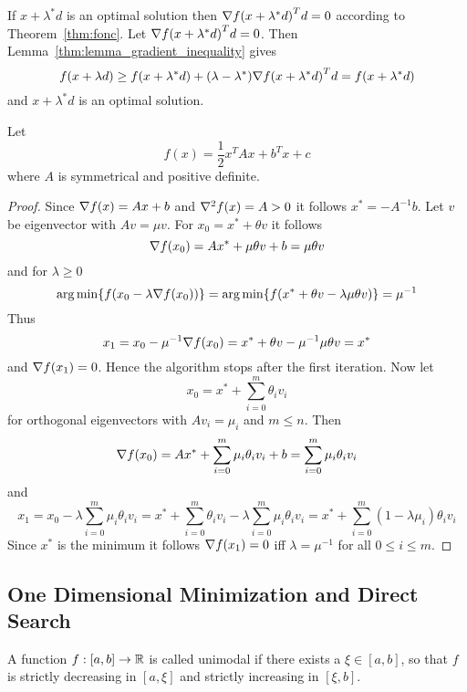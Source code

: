 \proof{}
If  \( x + \lambda^* d \) is an optimal solution then \( \nabla {f(x + \lambda^* d)}^T d = 0 \)
according to Theorem~\ref{thm:fonc}.
Let \( \nabla {f(x + \lambda^* d)}^T d = 0 \). Then Lemma~\ref{thm:lemma_gradient_inequality} gives
\[
    f(x + \lambda d) \ge f(x + \lambda^* d) + (\lambda - \lambda^*) \nabla {f(x + \lambda^* d)}^T d
    = f(x + \lambda^* d)
\]
and \( x + \lambda^* d \) is an optimal solution.
\bigskip


\begin{exercise}
    Let
    \[
        f(x) = \frac{1}{2} x^T{A}x + b^T x + c
    \]
    where \( A \) is symmetrical and positive definite.
\end{exercise}

\begin{proof}
    Since \( \nabla {f(x)} = Ax + b \) and \( \nabla^2 {f(x)} = A > 0 \) it follows \( x^* = -A^{-1}b \).
    Let \( v \) be eigenvector with \( Av = \mu v \). For \( x_0 = x^* + \theta v \) it follows
    \[
        \nabla {f(x_0)} = Ax^* + \mu \theta v + b = \mu \theta v
    \]
    and for \(\lambda \ge 0 \)
    \[
        \operatorname*{arg\,min} \{ f(x_0 - \lambda \nabla f(x_0)) \} =
        \operatorname*{arg\,min} \{ f(x^* + \theta v - \lambda \mu \theta v)\} = \mu^{-1}
    \]
    Thus
    \[
        x_1 = x_0 - \mu^{-1} \nabla f(x_0) = x^* + \theta v - \mu^{-1} \mu \theta v = x^*
    \]
    and \( \nabla {f(x_1)} = 0 \). Hence the algorithm stops after the first iteration.
    Now let
    \[
        x_0 = x^* + \sum_{i=0}^m \theta_i v_i
    \]
    for orthogonal eigenvectors with \( Av_i = \mu_i\) and \( m \le n \). Then
    \[
        \nabla {f(x_0)} = Ax^* + \sum_{i=0}^m \mu_i \theta_i v_i + b = \sum_{i=0}^m \mu_i \theta_i v_i
    \]
    and
    \[
        x_1 = x_0 - \lambda \sum_{i=0}^m \mu_i \theta_i v_i
        = x^* + \sum_{i=0}^m \theta_i v_i - \lambda \sum_{i=0}^m \mu_i \theta_i v_i
        = x^* + \sum_{i=0}^m (1 - \lambda \mu_i) \theta_i v_i
    \]
    Since \( x^* \) is the minimum it follows \( \nabla {f(x_1)} = 0 \) iff \( \lambda = \mu^{-1} \)
    for all \( 0 \le i \le m \).
\end{proof}
\bigskip



\subsection{One Dimensional Minimization and Direct Search}
\bigskip


\begin{definition}\label{def:unimodal_fnc}
    A function \( f : [a,b] \to \mathbb{R} \) is called unimodal if there exists a \( \xi \in [a,b] \), so that
    \( f \) is strictly decreasing in \( [a, \xi] \) and strictly increasing in \( [\xi, b] \).
\end{definition}
\bigskip

